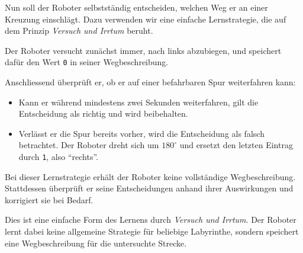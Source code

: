 Nun soll der Roboter selbstständig entscheiden,
welchen Weg er an einer Kreuzung einschlägt.
Dazu verwenden wir eine einfache Lernstrategie,
die auf dem Prinzip \emph{Versuch und Irrtum}
beruht.

Der Roboter versucht zunächst immer, nach links
abzubiegen, und speichert dafür den Wert \texttt{0}
in seiner Wegbeschreibung.

Anschliessend überprüft er, ob er auf einer
befahrbaren Spur weiterfahren kann:
\begin{itemize}
    \item Kann er während mindestens zwei Sekunden
          weiterfahren, gilt die Entscheidung als
          richtig und wird beibehalten.
    \item Verlässt er die Spur bereits vorher,
          wird die Entscheidung als falsch betrachtet.
          Der Roboter dreht sich um \(180^\circ\)
          und ersetzt den letzten Eintrag durch
          \texttt{1}, also \enquote{rechts}.
\end{itemize}

\begin{myremark}
    Bei dieser Lernstrategie erhält der Roboter
    keine vollständige Wegbeschreibung. Stattdessen
    überprüft er seine Entscheidungen anhand ihrer
    Auswirkungen und korrigiert sie bei Bedarf.

    Dies ist eine einfache Form des Lernens durch
    \emph{Versuch und Irrtum}. Der Roboter lernt dabei
    keine allgemeine Strategie für beliebige Labyrinthe,
    sondern speichert eine Wegbeschreibung für
    die untersuchte Strecke.
\end{myremark}

